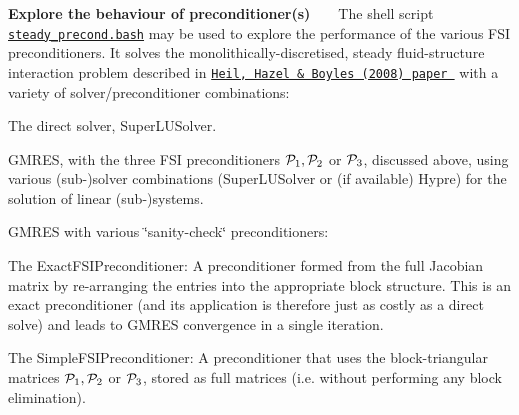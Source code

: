 \begin{DoxyEnumerate}
\item {\bfseries Explore the behaviour of preconditioner(s)} ~\newline
~\newline
 The shell script \href{../../../../demo_drivers/interaction/fsi_channel_seg_and_precond/steady_precond.bash}{\tt steady\+\_\+precond.\+bash} may be used to explore the performance of the various F\+SI preconditioners. It solves the monolithically-\/discretised, steady fluid-\/structure interaction problem described in \href{http://www.springerlink.com/content/m3r6318701g338g4/}{\tt Heil, Hazel \& Boyle\textquotesingle{}s (2008) paper } with a variety of solver/preconditioner combinations\+: ~\newline
~\newline

\begin{DoxyEnumerate}
\item The direct solver, {\ttfamily Super\+L\+U\+Solver}. ~\newline
~\newline

\item {\ttfamily G\+M\+R\+ES}, with the three F\+SI preconditioners $ {\cal P}_1, {\cal P}_2 $ or $ {\cal P}_3 $, discussed above, using various (sub-\/)solver combinations ({\ttfamily Super\+L\+U\+Solver} or (if available) {\ttfamily Hypre}) for the solution of linear (sub-\/)systems. ~\newline
~\newline

\item G\+M\+R\+ES with various \char`\"{}sanity-\/check\char`\"{} preconditioners\+: ~\newline
~\newline

\begin{DoxyItemize}
\item The {\ttfamily Exact\+F\+S\+I\+Preconditioner\+:} A preconditioner formed from the full Jacobian matrix by re-\/arranging the entries into the appropriate block structure. This is an exact preconditioner (and its application is therefore just as costly as a direct solve) and leads to G\+M\+R\+ES convergence in a single iteration. ~\newline
~\newline

\item The {\ttfamily Simple\+F\+S\+I\+Preconditioner\+:} A preconditioner that uses the block-\/triangular matrices $ {\cal P}_1, {\cal P}_2 $ or $ {\cal P}_3 $, stored as full matrices (i.\+e. without performing any block elimination). ~\newline
~\newline


\end{DoxyItemize}
\end{DoxyEnumerate}
\end{DoxyEnumerate}
